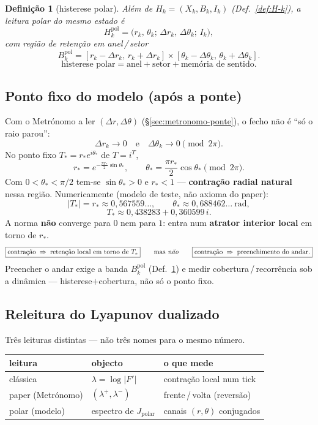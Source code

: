 \documentclass[11pt,a4paper]{article}
\newtheorem{definicao}{Definição}
\begin{document}
\begin{definicao}[histerese polar]\label{def:H-polar}
Além de $H_k=(X_k,B_k,I_k)$ (Def.~\ref{def:H-k}), a leitura polar
do mesmo estado é
\[
\boxed{
H_k^{\mathrm{pol}}
=
\bigl(r_k,\,\theta_k;\,\Delta r_k,\,\Delta\theta_k;\,I_k\bigr),
}
\]
com região de retenção em anel\,/\,setor
\[
\boxed{
B_k^{\mathrm{pol}}
=
[r_k-\Delta r_k,\,r_k+\Delta r_k]
\times
[\theta_k-\Delta\theta_k,\,\theta_k+\Delta\theta_k].
}
\]
\[
\boxed{\text{histerese polar}=\text{anel}+\text{setor}+\text{memória de sentido}}.
\]
\end{definicao}

\subsection*{Ponto fixo do modelo (após a ponte)}

Com o Metrónomo a ler $(\Delta r,\Delta\theta)$
(\S\ref{sec:metronomo-ponte}), o fecho não é ``só o raio parou'':
\[
\boxed{\Delta r_k\to0
\quad\text{e}\quad
\Delta\theta_k\to0\pmod{2\pi}}.
\]
No ponto fixo $T_{\ast}=r_{\ast}e^{i\theta_{\ast}}$ de $T=i^{T}$,
\[
\boxed{
r_{\ast}=e^{-\frac{\pi r_{\ast}}{2}\sin\theta_{\ast}},
\qquad
\theta_{\ast}=\frac{\pi r_{\ast}}{2}\cos\theta_{\ast}\pmod{2\pi}.
}
\]
Com $0<\theta_{\ast}<\pi/2$ tem-se $\sin\theta_{\ast}>0$ e
$r_{\ast}<1$ --- \textbf{contração radial natural} nessa região.
Numericamente (modelo de teste, não axioma do paper):
\[
\boxed{
|T_{\ast}|=r_{\ast}\approx 0{,}567559\ldots,
\qquad
\theta_{\ast}\approx 0{,}688462\ldots\ \mathrm{rad},
}
\]
\[
T_{\ast}\approx 0{,}438283+0{,}360599\,i.
\]
A norma \textbf{não} converge para $0$ nem para $1$: entra num
\textbf{atrator interior local} em torno de $r_{\ast}$.
\[
\boxed{
\text{contração}\;\Rightarrow\;\text{retenção local em torno de }T_{\ast}
}
\qquad\text{mas \emph{não}}
\qquad
\boxed{
\text{contração}\;\Rightarrow\;\text{preenchimento do andar}.
}
\]
Preencher o andar exige a banda $B_k^{\mathrm{pol}}$
(Def.~\ref{def:H-polar}) e medir cobertura\,/\,recorrência sob a
dinâmica --- histerese$+$cobertura, não só o ponto fixo.

\subsection*{Releitura do Lyapunov dualizado}\label{sec:lyap-dual-releitura}

Três leituras distintas --- não três nomes para o mesmo número.

\begin{center}\small
\begin{tabular}{@{}llp{6.2cm}@{}}
\toprule
leitura & objecto & o que mede \\
\midrule
clássica & $\lambda=\log|F'|$ & contração local num tick \\
paper (Metrónomo) & $(\lambda^{+},\lambda^{-})$ & frente\,/\,volta (reversão) \\
polar (modelo) & espectro de $J_{\mathrm{polar}}$ & canais $(r,\theta)$ conjugados \\
\bottomrule
\end{tabular}
\end{center}
\end{document}
